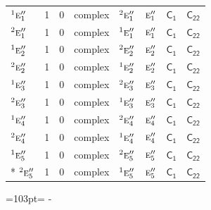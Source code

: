 \documentclass[10pt,a4paper]{article}
\newcommand{\needspace}[1]{\par\penalty-100\begingroup\dimen0=#1\relax\dimen2=\pagegoal
  \advance\dimen2-\pagetotal\ifdim\dimen0>\dimen2\relax\ifdim\dimen2>0pt\vfil\break\fi\fi
  \endgroup}
\numberwithin{equation}{section}
\newcommand{\grp}[1]{\mathsf{#1}}
\newcommand{\irr}[1]{\text{\normalfont\scshape #1}}
\newcommand{\conjpair}[1]{{}^{#1}}
\begin{document}
{\begin{longtable}{@{}lrrlllll@{}}
$\conjpair{1}\irr{e}_{1}''$ & 1 & $0$ & complex & $\conjpair{2}\irr{e}_{1}''$ & $\irr{e}_{1}''$ & \href{C1.pdf}{$\grp{C_{1}}$} & $\grp{C_{22}}$\\
$\conjpair{2}\irr{e}_{1}''$ & 1 & $0$ & complex & $\conjpair{1}\irr{e}_{1}''$ & $\irr{e}_{1}''$ & \href{C1.pdf}{$\grp{C_{1}}$} & $\grp{C_{22}}$\\
$\conjpair{1}\irr{e}_{2}''$ & 1 & $0$ & complex & $\conjpair{2}\irr{e}_{2}''$ & $\irr{e}_{2}''$ & \href{C1.pdf}{$\grp{C_{1}}$} & $\grp{C_{22}}$\\
$\conjpair{2}\irr{e}_{2}''$ & 1 & $0$ & complex & $\conjpair{1}\irr{e}_{2}''$ & $\irr{e}_{2}''$ & \href{C1.pdf}{$\grp{C_{1}}$} & $\grp{C_{22}}$\\
$\conjpair{1}\irr{e}_{3}''$ & 1 & $0$ & complex & $\conjpair{2}\irr{e}_{3}''$ & $\irr{e}_{3}''$ & \href{C1.pdf}{$\grp{C_{1}}$} & $\grp{C_{22}}$\\
$\conjpair{2}\irr{e}_{3}''$ & 1 & $0$ & complex & $\conjpair{1}\irr{e}_{3}''$ & $\irr{e}_{3}''$ & \href{C1.pdf}{$\grp{C_{1}}$} & $\grp{C_{22}}$\\
$\conjpair{1}\irr{e}_{4}''$ & 1 & $0$ & complex & $\conjpair{2}\irr{e}_{4}''$ & $\irr{e}_{4}''$ & \href{C1.pdf}{$\grp{C_{1}}$} & $\grp{C_{22}}$\\
$\conjpair{2}\irr{e}_{4}''$ & 1 & $0$ & complex & $\conjpair{1}\irr{e}_{4}''$ & $\irr{e}_{4}''$ & \href{C1.pdf}{$\grp{C_{1}}$} & $\grp{C_{22}}$\\
$\conjpair{1}\irr{e}_{5}''$ & 1 & $0$ & complex & $\conjpair{2}\irr{e}_{5}''$ & $\irr{e}_{5}''$ & \href{C1.pdf}{$\grp{C_{1}}$} & $\grp{C_{22}}$\\*
$\conjpair{2}\irr{e}_{5}''$ & 1 & $0$ & complex & $\conjpair{1}\irr{e}_{5}''$ & $\irr{e}_{5}''$ & \href{C1.pdf}{$\grp{C_{1}}$} & $\grp{C_{22}}$\\
\bottomrule\end{longtable}}
\needspace{103pt}
\end{document}
